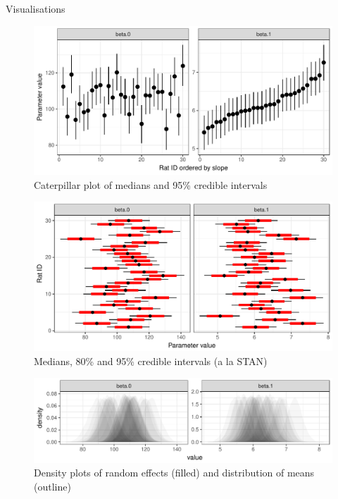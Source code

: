 {\begin{columns}
 \begin{column}[t]{0.45\linewidth}
 


\begin{block}{Visualisations}
	\setlength{\parskip}{15pt}


\begin{figure}
	\includegraphics[width=0.8\linewidth]{raterpillar}
	\caption{Caterpillar plot of medians and 95\% credible intervals}
\end{figure}

\begin{figure}
	\includegraphics[width=0.8\linewidth]{stan}
	\caption{Medians, 80\% and 95\% credible intervals (a la STAN)}
\end{figure}

\begin{figure}
	\includegraphics[width=0.8\linewidth]{ghost}
	\caption{Density plots of random effects (filled) and distribution of means (outline)}
\end{figure}


\end{block}
\end{column}
\end{columns}}
